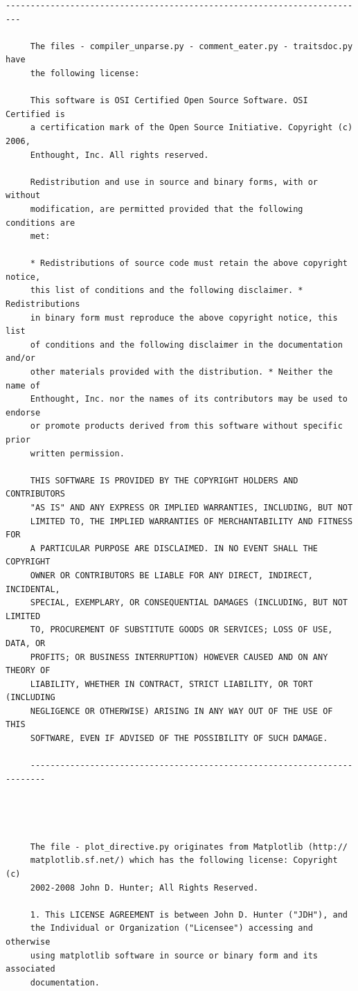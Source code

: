 \begin{lstlisting}[basicstyle=\ttfamily\footnotesize,breaklines=true]
     -------------------------------------------------------------------------

     The files - compiler_unparse.py - comment_eater.py - traitsdoc.py have
     the following license:

     This software is OSI Certified Open Source Software. OSI Certified is
     a certification mark of the Open Source Initiative. Copyright (c) 2006,
     Enthought, Inc. All rights reserved.

     Redistribution and use in source and binary forms, with or without
     modification, are permitted provided that the following conditions are
     met:

     * Redistributions of source code must retain the above copyright notice,
     this list of conditions and the following disclaimer. * Redistributions
     in binary form must reproduce the above copyright notice, this list
     of conditions and the following disclaimer in the documentation and/or
     other materials provided with the distribution. * Neither the name of
     Enthought, Inc. nor the names of its contributors may be used to endorse
     or promote products derived from this software without specific prior
     written permission.

     THIS SOFTWARE IS PROVIDED BY THE COPYRIGHT HOLDERS AND CONTRIBUTORS
     "AS IS" AND ANY EXPRESS OR IMPLIED WARRANTIES, INCLUDING, BUT NOT
     LIMITED TO, THE IMPLIED WARRANTIES OF MERCHANTABILITY AND FITNESS FOR
     A PARTICULAR PURPOSE ARE DISCLAIMED. IN NO EVENT SHALL THE COPYRIGHT
     OWNER OR CONTRIBUTORS BE LIABLE FOR ANY DIRECT, INDIRECT, INCIDENTAL,
     SPECIAL, EXEMPLARY, OR CONSEQUENTIAL DAMAGES (INCLUDING, BUT NOT LIMITED
     TO, PROCUREMENT OF SUBSTITUTE GOODS OR SERVICES; LOSS OF USE, DATA, OR
     PROFITS; OR BUSINESS INTERRUPTION) HOWEVER CAUSED AND ON ANY THEORY OF
     LIABILITY, WHETHER IN CONTRACT, STRICT LIABILITY, OR TORT (INCLUDING
     NEGLIGENCE OR OTHERWISE) ARISING IN ANY WAY OUT OF THE USE OF THIS
     SOFTWARE, EVEN IF ADVISED OF THE POSSIBILITY OF SUCH DAMAGE.

     -------------------------------------------------------------------------




     The file - plot_directive.py originates from Matplotlib (http://
     matplotlib.sf.net/) which has the following license: Copyright (c)
     2002-2008 John D. Hunter; All Rights Reserved.

     1. This LICENSE AGREEMENT is between John D. Hunter ("JDH"), and
     the Individual or Organization ("Licensee") accessing and otherwise
     using matplotlib software in source or binary form and its associated
     documentation.


\end{lstlisting}
